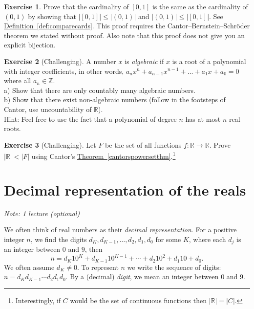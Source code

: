 \documentclass[12pt]{book}
\newcommand{\abs}[1]{\left\lvert {#1} \right\rvert}
\newcommand{\R}{{\mathbb{R}}}
\newcommand{\Z}{{\mathbb{Z}}}
\newcommand{\myindex}[1]{#1\index{#1}}
\newcommand{\sectionnotes}[1]{\noindent \emph{Note: #1} \medskip \par}
\newcommand{\sectionnewpage}{\clearpage}
\theoremstyle{plain}
\theoremstyle{remark}
\theoremstyle{definition}
\theoremstyle{exercise}
\newtheorem{exercise}{Exercise}[section]
\theoremstyle{example}
\newcommand{\thmref}[1]{\hyperref[#1]{Theorem~\ref*{#1}}}
\newcommand{\defnref}[1]{\hyperref[#1]{Definition~\ref*{#1}}}
\begin{document}
\begin{exercise}
Prove that the cardinality of $[0,1]$ is the same as the cardinality of
$(0,1)$ by showing that
$\abs{[0,1]} \leq \abs{(0,1)}$ and
$\abs{(0,1)} \leq \abs{[0,1]}$.  See 
\defnref{def:comparecards}.
This proof requires the Cantor--Bernstein--Schr\"oder theorem we
stated without proof.  Also note that this proof does not give you an
explicit bijection.
\end{exercise}

\begin{exercise}[Challenging]
A number $x$ is \emph{algebraic} if $x$ is a root of a polynomial with
integer coefficients, in other words, $a_n x^n + a_{n-1} x^{n-1}  + \ldots
+ a_1 x + a_0 = 0$ where all $a_n \in \Z$.\\
a) Show that there are only
countably many algebraic numbers.\\
b) Show that there exist non-algebraic
numbers (follow in the footsteps of Cantor, use uncountability of $\R$).\\
Hint: Feel free to use the fact that a polynomial of degree $n$ has at most $n$ real
roots.
\end{exercise}

\begin{exercise}[Challenging]
Let $F$ be the set of all functions $f \colon \R \to \R$.
Prove $\abs{\R} < \abs{F}$
using Cantor's \thmref{cantorspowersetthm}.\footnote{Interestingly,
if $C$ would be the set of continuous functions then $\abs{\R} = \abs{C}$.}
\end{exercise}


\sectionnewpage
\section{Decimal representation of the reals}
\label{sec:decimals}

\sectionnotes{1 lecture (optional)}

We often think of real numbers as their
\emph{\myindex{decimal representation}}.  For
a positive integer $n$, we find the digits $d_K,d_{K-1},\ldots,d_2,d_1,d_0$ for some
$K$,
where each $d_j$ is an integer between $0$ and $9$, then
\begin{equation*}
n = d_K {10}^K + d_{K-1} {10}^{K-1} + \cdots + d_2 {10}^2 + d_1 10 + d_0 .
\end{equation*}
We often assume $d_K \not= 0$.  To represent $n$ we write the sequence of
digits: $n = d_K d_{K-1} \cdots d_2 d_1 d_0$.
By a (decimal)
\emph{\myindex{digit}}, we mean an integer
between $0$ and $9$.
\end{document}
